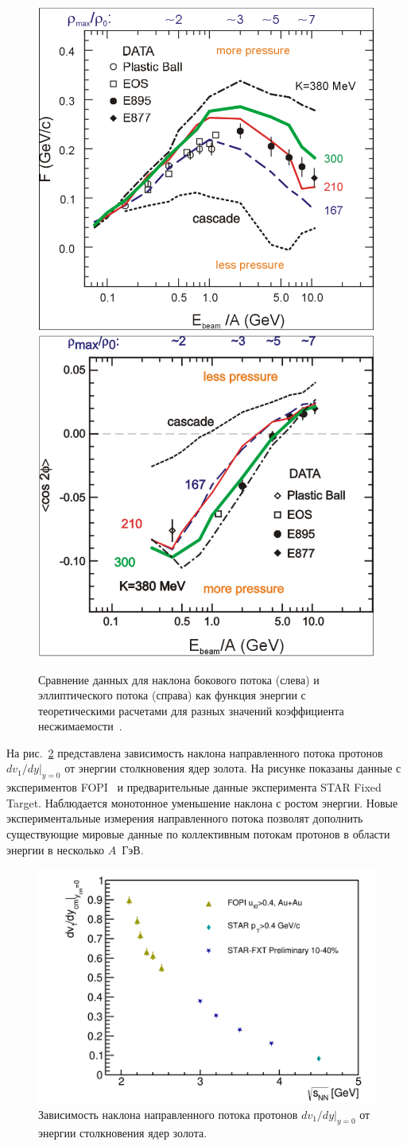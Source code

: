 \begin{figure}[h]
    \centering
    \includegraphics[width=0.45\linewidth]{images/Danilewicz_F_energy.png}
    \includegraphics[width=0.45\linewidth]{images/Danilewicz_Elliptic_energy.png}
    \caption{Сравнение данных для наклона бокового потока (слева) и эллиптического потока (справа) как функция энергии с теоретическими расчетами для разных значений коэффициента несжимаемости~\cite{Danielewicz:2002pu}.}
    \label{fig:Danilewicz}
\end{figure}

На рис.~\ref{fig:dv1dy_energy} представлена зависимость наклона направленного потока протонов $dv_1/dy|_{y=0}$ от энергии столкновения ядер золота.
На рисунке показаны данные с экспериментов FOPI~\cite{FOPI:2011aa} и предварительные данные эксперимента STAR Fixed Target.
Наблюдается монотонное уменьшение наклона с ростом энергии.
Новые экспериментальные измерения направленного потока позволят дополнить существующие мировые данные по коллективным потокам протонов в области энергии в несколько $A$~ГэВ.
%
\begin{figure}
    \centering
    \includegraphics[width=0.5\linewidth]{images/dv1dy_sqrt_snn.png}
    \caption{Зависимость наклона направленного потока протонов $dv_1/dy|_{y=0}$ от энергии столкновения ядер золота.}
    \label{fig:dv1dy_energy}
\end{figure}

